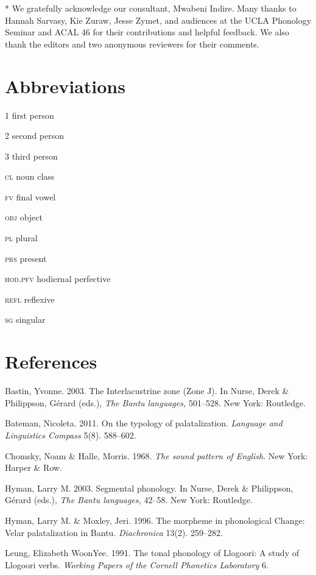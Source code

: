 \documentclass[output=paper]{langsci/langscibook}
\begin{document}
* We gratefully acknowledge our consultant, Mwabeni Indire. Many thanks to Hannah Sarvasy, Kie Zuraw, Jesse Zymet, and audiences at the UCLA Phonology Seminar and ACAL 46 for their contributions and helpful feedback. We also thank the editors and two anonymous reviewers for their comments.

\chapter{Abbreviations}

\textsc{1    }first person

\textsc{2    }second person

\textsc{3    }third person

\textsc{cl}    noun class

\textsc{fv    }final vowel

\textsc{obj}    object

\textsc{pl}    plural

\textsc{prs}    present

\textsc{hod.pfv}  hodiernal perfective

\textsc{refl}    reflexive

\textsc{sg    }singular

\chapter{}
\chapter{References}

Bastin, Yvonne. 2003. The Interlacustrine zone (Zone J). In Nurse, Derek \& Philippson, Gérard (eds.), \textit{The Bantu languages,} 501–528. New York: Routledge. 

Bateman, Nicoleta. 2011. On the typology of palatalization. \textit{Language and Linguistics Compass} 5(8). 588–602.

Chomsky, Noam \& Halle, Morris. 1968. \textit{The sound pattern of English}. New York: Harper \& Row. 

Hyman, Larry M. 2003. Segmental phonology. In Nurse, Derek \& Philippson, Gérard (eds.), \textit{The Bantu languages,} 42–58. New York: Routledge.

Hyman, Larry M. \& Moxley, Jeri. 1996. The morpheme in phonological Change: Velar palatalization in Bantu. \textit{Diachronica }13(2). 259–282. 

Leung, Elizabeth WoonYee. 1991. The tonal phonology of Llogoori: A study of Llogoori verbs. \textit{Working Papers of the Cornell Phonetics Laboratory }6. 
\end{document}
